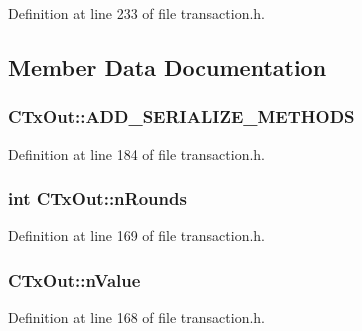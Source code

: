 Definition at line 233 of file transaction.\+h.



\subsection{Member Data Documentation}
\hypertarget{class_c_tx_out_add758078b21ec1004fe8144fcee44890}{}
\subsubsection[{A\+D\+D\+\_\+\+S\+E\+R\+I\+A\+L\+I\+Z\+E\+\_\+\+M\+E\+T\+H\+O\+D\+S}]{\setlength{\rightskip}{0pt plus 5cm}C\+Tx\+Out\+::\+A\+D\+D\+\_\+\+S\+E\+R\+I\+A\+L\+I\+Z\+E\+\_\+\+M\+E\+T\+H\+O\+D\+S}\label{class_c_tx_out_add758078b21ec1004fe8144fcee44890}


Definition at line 184 of file transaction.\+h.

\hypertarget{class_c_tx_out_aeac97244e392de9dad0c0d0dd0184d1e}{}
\subsubsection[{n\+Rounds}]{\setlength{\rightskip}{0pt plus 5cm}int C\+Tx\+Out\+::n\+Rounds}\label{class_c_tx_out_aeac97244e392de9dad0c0d0dd0184d1e}


Definition at line 169 of file transaction.\+h.

\hypertarget{class_c_tx_out_ab278ecef3817a972cb6bc5360d13f197}{}
\subsubsection[{n\+Value}]{ C\+Tx\+Out\+::n\+Value}\label{class_c_tx_out_ab278ecef3817a972cb6bc5360d13f197}


Definition at line 168 of file transaction.\+h.

\hypertarget{class_c_tx_out_a25bf3f2f4befb22a6a0be45784fe57e2}{}
